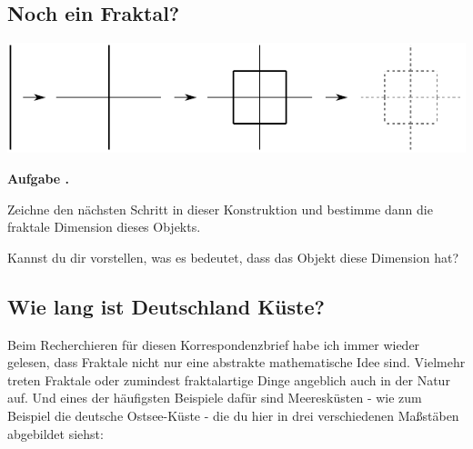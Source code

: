 \documentclass[a4paper,ngerman,12pt]{scrartcl}
\theoremstyle{definition}
\theoremstyle{plain}
\theoremstyle{remark}
\newlength{\aufgabenskip}
\newcounter{aufgabennummer}
\newenvironment{aufgabe}[1]{
  \addtocounter{aufgabennummer}{1}
  \textbf{Aufgabe \theaufgabennummer.} \emph{#1} \par
}{\vspace{\aufgabenskip}}
\begin{document}
%


\newpage

\subsection{Noch ein Fraktal?}

\begin{center}
	\includegraphics{Bilder/Nicht-Fraktal.pdf}
\end{center}

\begin{aufgabe}{}
	Zeichne den nächsten Schritt in dieser Konstruktion und bestimme dann die fraktale Dimension dieses Objekts.
	
	Kannst du dir vorstellen, was es bedeutet, dass das Objekt diese Dimension hat?
\end{aufgabe}

\subsection{Wie lang ist Deutschland Küste?}

Beim Recherchieren für diesen Korrespondenzbrief habe ich immer wieder gelesen, dass Fraktale nicht nur eine abstrakte mathematische Idee sind. Vielmehr treten Fraktale oder zumindest fraktalartige Dinge angeblich auch in der Natur auf. Und eines der häufigsten Beispiele dafür sind Meeresküsten - wie zum Beispiel die deutsche Ostsee-Küste - die du hier in drei verschiedenen Maßstäben abgebildet siehst:
\end{document}

